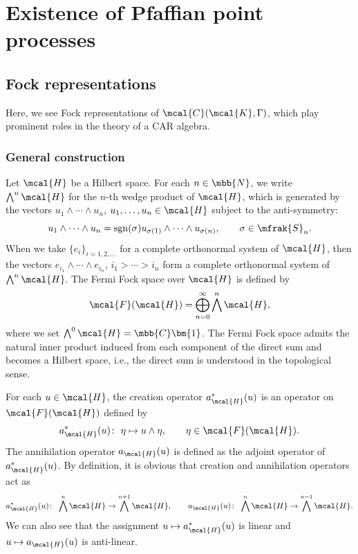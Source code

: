 \section{Existence of Pfaffian point processes} \label{sect:existence_PfPP}
\subsection{Fock representations}
Here, we see Fock representations of $\mcal{C}(\mcal{K},\Gamma)$, which play prominent roles in the theory of a CAR algebra.
\subsubsection{General construction}
Let $\mcal{H}$ be a Hilbert space.
For each $n\in\mbb{N}$, we write $\bigwedge^{n}\mcal{H}$ for the $n$-th wedge product of $\mcal{H}$, which is generated by the vectors $u_{1}\wedge\cdots \wedge u_{n}$, $u_{1},\dots, u_{n}\in\mcal{H}$ subject to the anti-symmetry:
\begin{equation*}
	u_{1}\wedge\cdots \wedge u_{n}=\operatorname{sgn} (\sigma) u_{\sigma(1)}\wedge\cdots \wedge u_{\sigma (n)},\qquad \sigma\in \mfrak{S}_{n}.
\end{equation*}
When we take $\{e_{i}\}_{i=1,2,\dots}$ for a complete orthonormal system of $\mcal{H}$, then the vectors $e_{i_{1}}\wedge\cdots \wedge e_{i_{n}}$, $i_{1}>\cdots >i_{n}$ form a complete orthonormal system of $\bigwedge^{n}\mcal{H}$.
The Fermi Fock space over $\mcal{H}$ is defined by
\begin{equation*}
	\mcal{F}(\mcal{H})=\bigoplus_{n=0}^{\infty}\bigwedge^{n}\mcal{H},
\end{equation*}
where we set $\bigwedge^{0}\mcal{H}=\mbb{C}\bm{1}$.
The Fermi Fock space admits the natural inner product induced from each component of the direct sum and becomes a Hilbert space, i.e., the direct sum is understood in the topological sense.

For each $u\in \mcal{H}$, the creation operator $a_{\mcal{H}}^{\ast}(u)$ is an operator on $\mcal{F}(\mcal{H})$ defined by
\begin{equation*}
	a_{\mcal{H}}^{\ast}(u)\colon \ \eta\mapsto u\wedge \eta,\qquad \eta\in \mcal{F}(\mcal{H}).
\end{equation*}
The annihilation operator $a_{\mcal{H}}(u)$ is defined as the adjoint operator of $a_{\mcal{H}}^{\ast}(u)$.
By definition, it is obvious that creation and annihilation operators act as
\begin{equation*}
	a_{\mcal{H}}^{\ast}(u)\colon \ \bigwedge^{n}\mcal{H}\to \bigwedge^{n+1}\mcal{H},\qquad a_{\mcal{H}}(u)\colon \ \bigwedge^{n}\mcal{H}\to \bigwedge^{n-1}\mcal{H}.
\end{equation*}
We can also see that the assignment $u\mapsto a_{\mcal{H}}^{\ast}(u)$ is linear and $u\mapsto a_{\mcal{H}}(u)$ is anti-linear.

